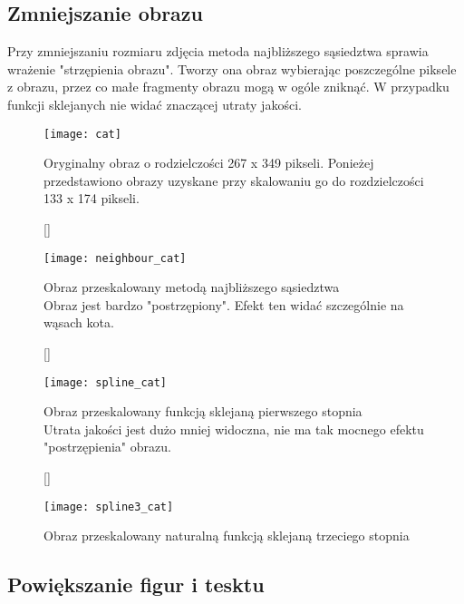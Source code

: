 \documentclass{mwart}
\theoremstyle{definition}
\begin{document}
\clearpage
\subsection{Zmniejszanie obrazu}
Przy zmniejszaniu rozmiaru zdjęcia metoda najbliższego sąsiedztwa sprawia wrażenie "strzępienia obrazu". Tworzy ona obraz wybierając poszczególne piksele z obrazu, przez co małe fragmenty obrazu mogą w ogóle zniknąć. W przypadku funkcji sklejanych nie widać znaczącej utraty jakości.

\begin{figure}[h!]
	\centering
	\texttt{[image: cat]}
	\caption*{Oryginalny obraz o rodzielczości 267 x 349 pikseli. Ponieżej przedstawiono obrazy uzyskane przy skalowaniu go do rozdzielczości 133 x 174 pikseli.}
	\label{fig:cat}
\end{figure}

\clearpage

\begin{figure}[h!]
[\FBwidth]
{\caption*{Obraz przeskalowany metodą najbliższego sąsiedztwa \\ Obraz jest bardzo "postrzępiony". Efekt ten widać szczególnie na wąsach kota. }\label{aa}}
{\texttt{[image: neighbour\_cat]}}
\end{figure}

\begin{figure}[h!]
[\FBwidth]
{\caption*{Obraz przeskalowany funkcją sklejaną pierwszego stopnia \\ Utrata jakości jest dużo mniej widoczna, nie ma tak mocnego efektu "postrzępienia" obrazu.}\label{aa}}
{\texttt{[image: spline\_cat]}}
\end{figure}

\begin{figure}[h!]
[\FBwidth]
{\caption*{Obraz przeskalowany naturalną funkcją sklejaną trzeciego stopnia}\label{aa}}
{\texttt{[image: spline3\_cat]}}
\end{figure}


\clearpage
\subsection{Powiększanie figur i tesktu}
\end{document}
